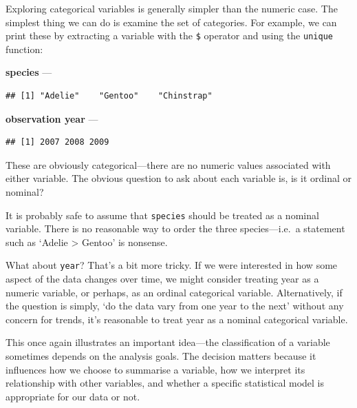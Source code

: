 \documentclass[
]{book}
\newenvironment{Shaded}{\begin{snugshade}}{\end{snugshade}}
\newcommand{\FunctionTok}[1]{\textcolor[rgb]{0.00,0.00,0.00}{#1}}
\newcommand{\NormalTok}[1]{#1}
\newcommand{\SpecialCharTok}[1]{\textcolor[rgb]{0.00,0.00,0.00}{#1}}
\begin{document}
Exploring categorical variables is generally simpler than the numeric case. The simplest thing we can do is examine the set of categories. For example, we can print these by extracting a variable with the \texttt{\$} operator and using the \texttt{unique} function:

\textbf{species} ---

\begin{Shaded}
\end{Shaded}

\begin{verbatim}
## [1] "Adelie"    "Gentoo"    "Chinstrap"
\end{verbatim}

\textbf{observation year} ---

\begin{Shaded}
\end{Shaded}

\begin{verbatim}
## [1] 2007 2008 2009
\end{verbatim}

These are obviously categorical---there are no numeric values associated with either variable. The obvious question to ask about each variable is, is it ordinal or nominal?

It is probably safe to assume that \texttt{species} should be treated as a nominal variable. There is no reasonable way to order the three species---i.e.~a statement such as `Adelie \textgreater{} Gentoo' is nonsense.

What about \texttt{year}? That's a bit more tricky. If we were interested in how some aspect of the data changes over time, we might consider treating year as a numeric variable, or perhaps, as an ordinal categorical variable. Alternatively, if the question is simply, `do the data vary from one year to the next' without any concern for trends, it's reasonable to treat year as a nominal categorical variable.

This once again illustrates an important idea---the classification of a variable sometimes depends on the analysis goals. The decision matters because it influences how we choose to summarise a variable, how we interpret its relationship with other variables, and whether a specific statistical model is appropriate for our data or not.
\end{document}
